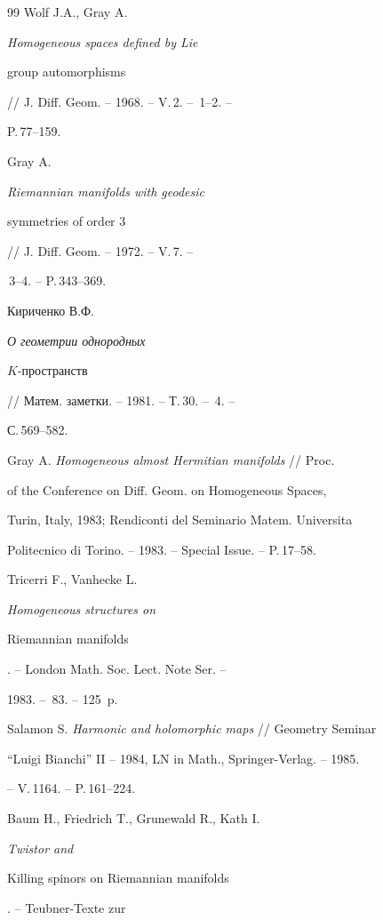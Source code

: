 \begin{thebibliography}{99}
 Wolf J.A., Gray A. {\it Homogeneous spaces defined by Lie


group automorphisms} // J. Diff. Geom. -- 1968. -- V.\,2. -- \No\,1--2. --


P.\,77--159.





 Gray A. {\it Riemannian manifolds with geodesic


symmetries of order $3$} // J. Diff. Geom. -- 1972. -- V.\,7. --


\No\,3--4. -- P.\,343--369.








 Кириченко В.Ф. {\it О геометрии однородных


$K$-пространств} // Матем. заметки. -- 1981. -- Т.\,30. -- \No\,4. --


С.\,569--582.





 Gray A. {\it Homogeneous almost Hermitian manifolds} // Proc.


of the Conference on Diff. Geom. on Homogeneous Spaces,


Turin, Italy, 1983; Rendiconti del Seminario Matem. Universita


Politecnico di Torino. -- 1983. -- Special Issue. -- P.\,17--58.





 Tricerri F., Vanhecke L. {\it Homogeneous structures on


Riemannian manifolds}. -- London Math. Soc. Lect. Note Ser. --


1983. -- \No\,83. -- 125~p.





 Salamon S. {\it Harmonic and holomorphic maps} // Geometry Seminar


``Luigi Bianchi'' II -- 1984, LN in Math., Springer-Verlag. -- 1985.


-- V.\,1164. -- P.\,161--224.





 Baum H., Friedrich T., Grunewald R., Kath I. {\it Twistor and


Killing spinors on Riemannian manifolds}. -- Teubner-Texte zur



\end{thebibliography}
